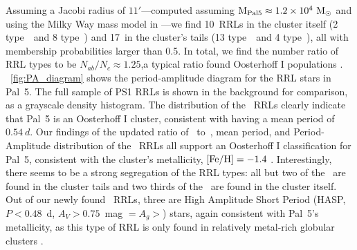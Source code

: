 \documentclass[twocolumn]{aastex63}
\newcommand{\sa}[1]{{\color{teal} SP: #1}}
\newcommand{\NRRcl}{10}     %
\newcommand{\NRRtails}{17} %
\begin{document}
Assuming a Jacobi radius of $11'$---computed assuming $\textrm{M}_{\rm Pal 5} \approx 1.2\times10^4~\mathrm{M}_\odot$ \citep{Kuepper:2015} and using the Milky Way mass model in \citet{gala}---we find \NRRcl\ RRLs in the cluster itself (2 type~\typeab\ and 8 type~\typec) and \NRRtails\ in the cluster's tails (13 type~\typeab\ and 4 type~\typec), all with membership probabilities larger than 0.5. In total, we find the number ratio of RRL types to be $N_{ab} / N_{c} \approx 1.25$,a typical ratio found Oosterhoff I populations \citep{Smith:1995}. 
\figurename~\ref{fig:PA_diagram} shows the period-amplitude diagram for the RRL stars in Pal~5.
The full sample of PS1 RRLs is shown in the background for comparison, as a grayscale density histogram. The distribution of the \typeab~RRLs clearly indicate that Pal~5 is an Oosterhoff I cluster, consistent with having a mean period of $0.54~d$.
Our findings of the updated ratio of \rrab~to~\rrc, mean period, and Period-Amplitude distribution of the \rrab\ RRLs all support an Oosterhoff I classification for Pal~5, consistent with the cluster's metallicity, $[\mathrm{Fe}/\mathrm{H}]=-1.4$ \citep{Dotter:2011}. Interestingly, there seems to be a strong segregation of the RRL types: all but two of the \rrab~are found in the cluster tails and two thirds of the \rrc~are found in the cluster itself. 
Out of our newly found \rrab\ RRLs, three are High Amplitude Short Period (HASP, $P <0.48$~d, $A_V>0.75$~mag $=A_g>$) stars, again consistent with Pal~5's metallicity,  as this type of RRL is only found in relatively metal-rich globular clusters  \citep[$\FeH>-1.5$;][]{Monelli:2017}.

\end{document}

